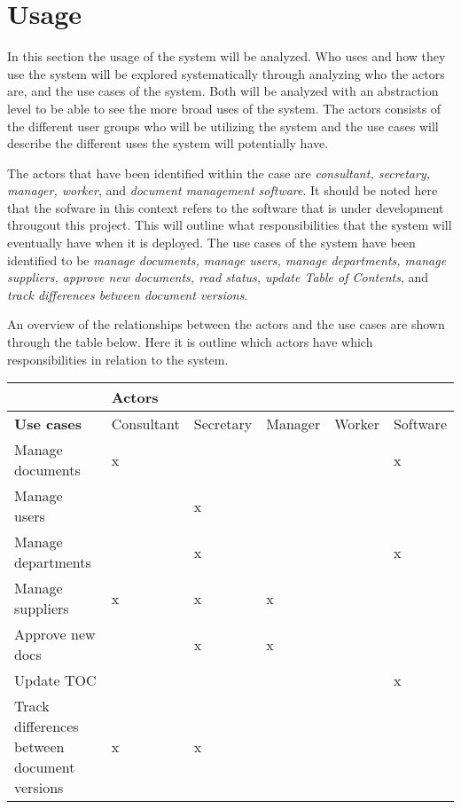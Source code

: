 \section{Usage}

In this section the usage of the system will be analyzed. Who uses and how they use the system will be explored systematically through analyzing who the actors are, and the use cases of the system.
Both will be analyzed with an abstraction level to be able to see the more broad uses of the system.
The actors consists of the different user groups who will be utilizing the system and the use cases will describe the different uses the system will potentially have.

The actors that have been identified within the case are \textit{consultant, secretary, manager, worker}, and \textit{document management software}.
It should be noted here that the sofware in this context refers to the software that is under development througout this project.
This will outline what responsibilities that the system will eventually have when it is deployed.
The use cases of the system have been identified to be \textit{manage documents, manage users, manage departments, manage suppliers, approve new documents, read status, update Table of Contents}, and \textit{track differences between document versions}.

An overview of the relationships between the actors and the use cases are shown through the table below. Here it is outline which actors have which responsibilities in relation to the system.

\begin{center}
\begin{tabular}{| m{10em} | m{4.5em} | m{4.5em} | m{4.5em} | m{4.5em} | m{} |}
	\hline
	& \textbf{Actors} & & & & \\
	\hline
	\textbf{Use cases} & Consultant & Secretary & Manager & Worker & Software \\
	\hline
	Manage documents & x & & & & x \\
	\hline
	Manage users & & x & & & \\
	\hline
	Manage departments & & x & & & x \\
	\hline
	Manage suppliers & x & x & x & &\\
	\hline
	Approve new docs & & x & x & & \\
	\hline
	Update TOC & & & & & x \\
	\hline
	Track differences between document versions & x & x & & &\\
	\hline
\end{tabular}
\end{center}

